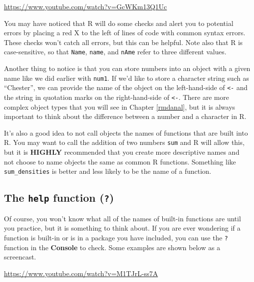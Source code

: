 \documentclass[]{tufte-book}
\begin{document}
\vspace{0.1in}\begin{center}\footnotesize{\url{https://www.youtube.com/watch?v=GcWKm13Q1Uc}}\end{center}\vspace{0.1in}

You may have noticed that R will do some checks and alert you to potential errors by placing a red X to the left of lines of code with common syntax errors. These checks won't catch all errors, but this can be helpful. Note also that R is case-sensitive, so that \texttt{Name}, \texttt{name}, and \texttt{nAme} refer to three different values.

Another thing to notice is that you can store numbers into an object with a given name like we did earlier with \texttt{num1}. If we'd like to store a character string such as ``Chester'', we can provide the name of the object on the left-hand-side of \texttt{\textless{}-} and the string in quotation marks on the right-hand-side of \texttt{\textless{}-}. There are more complex object types that you will see in Chapter \ref{rmdanal}, but it is always important to think about the difference between a number and a character in R.

It's also a good idea to not call objects the names of functions that are built into R. You may want to call the addition of two numbers \texttt{sum} and R will allow this, but it is \textbf{HIGHLY} recommended that you create more descriptive names and not choose to name objects the same as common R functions. Something like \texttt{sum\_densities} is better and less likely to be the name of a function.

\subsection{\texorpdfstring{The \texttt{help} function (\texttt{?})}{The help function (?)}}\label{the-help-function}

Of course, you won't know what all of the names of built-in functions are until you practice, but it is something to think about. If you are ever wondering if a function is built-in or is in a package you have included, you can use the \texttt{?} function in the \textbf{Console} to check. Some examples are shown below as a screencast.

\vspace{0.1in}\begin{center}\footnotesize{\url{https://www.youtube.com/watch?v=M1TJrL-ss7A}}\end{center}\vspace{0.1in}
\end{document}
